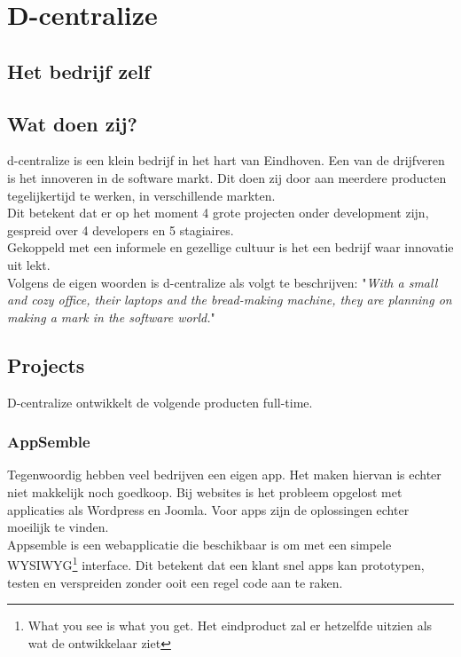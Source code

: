 \chapter{D-centralize}

\section{Het bedrijf zelf}


\section{Wat doen zij?}
d-centralize is een klein bedrijf in het hart van Eindhoven. Een van de drijfveren is het innoveren in de software markt. Dit doen zij door aan meerdere producten tegelijkertijd te werken, in verschillende markten. \\

Dit betekent dat er op het moment 4 grote projecten onder development zijn, gespreid over 4 developers en 5 stagiaires. \\

Gekoppeld met een informele en gezellige cultuur is het een bedrijf waar innovatie uit lekt. \\

Volgens de eigen woorden is d-centralize als volgt te beschrijven: "\textit{With a small and cozy office, their laptops and the bread-making machine, they are planning on making a mark in the software world.}" \cite{dcent1}

\section{Projects}

D-centralize ontwikkelt de volgende producten full-time.

\subsection{AppSemble}

Tegenwoordig hebben veel bedrijven een eigen app. Het maken hiervan is echter niet makkelijk noch goedkoop. Bij websites is het probleem opgelost met applicaties als Wordpress en Joomla. Voor apps zijn de oplossingen echter moeilijk te vinden. \\

Appsemble is een webapplicatie die beschikbaar is om met een simpele WYSIWYG\footnote{What you see is what you get. Het eindproduct zal er hetzelfde uitzien als wat de ontwikkelaar ziet} interface. Dit betekent dat een klant snel apps kan prototypen, testen en verspreiden zonder ooit een regel code aan te raken. \\

